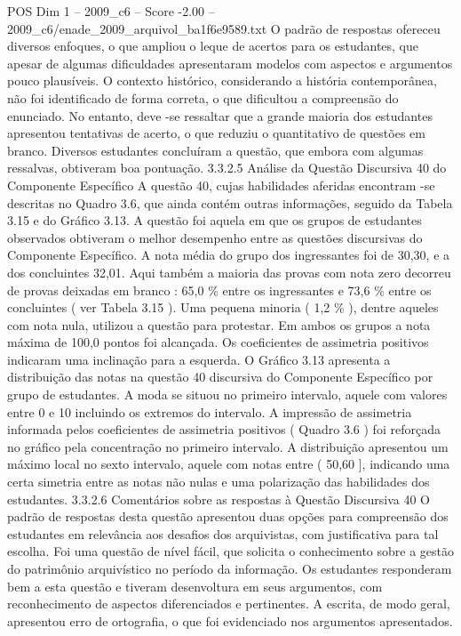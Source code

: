 \begin{textsample}{POS Dim 1 – 2009\_c6 – Score -2.00 – 2009\_c6/enade\_2009\_arquivol\_ba1f6e9589.txt}
O padrão de respostas ofereceu diversos enfoques, o que ampliou o leque de acertos para os estudantes, que apesar de algumas dificuldades apresentaram modelos com aspectos e argumentos pouco plausíveis.
O contexto histórico, considerando a história contemporânea, não foi identificado de forma correta, o que dificultou a compreensão do enunciado.
No entanto, deve -se ressaltar que a grande maioria dos estudantes apresentou tentativas de acerto, o que reduziu o quantitativo de questões em branco.
Diversos estudantes concluíram a questão, que embora com algumas ressalvas, obtiveram boa pontuação. 3.3.2.5 Análise da Questão Discursiva 40 do Componente Específico A questão 40, cujas habilidades aferidas encontram -se descritas no Quadro 3.6, que ainda contém outras informações, seguido da Tabela 3.15 e do Gráfico 3.13.
A questão foi aquela em que os grupos de estudantes observados obtiveram o melhor desempenho entre as questões discursivas do Componente Específico.
A nota média do grupo dos ingressantes foi de 30,30, e a dos concluintes 32,01.
Aqui também a maioria das provas com nota zero decorreu de provas deixadas em branco : 65,0 \% entre os ingressantes e 73,6 \% entre os concluintes ( ver Tabela 3.15 ).
Uma pequena minoria ( 1,2 \% ), dentre aqueles com nota nula, utilizou a questão para protestar.
Em ambos os grupos a nota máxima de 100,0 pontos foi alcançada.
Os coeficientes de assimetria positivos indicaram uma inclinação para a esquerda.
O Gráfico 3.13 apresenta a distribuição das notas na questão 40 discursiva do Componente Específico por grupo de estudantes.
A moda se situou no primeiro intervalo, aquele com valores entre 0 e 10 incluindo os extremos do intervalo.
A impressão de assimetria informada pelos coeficientes de assimetria positivos ( Quadro 3.6 ) foi reforçada no gráfico pela concentração no primeiro intervalo.
A distribuição apresentou um máximo local no sexto intervalo, aquele com notas entre ( 50,60 ], indicando uma certa simetria entre as notas não nulas e uma polarização das habilidades dos estudantes. 3.3.2.6 Comentários sobre as respostas à Questão Discursiva 40 O padrão de respostas desta questão apresentou duas opções para compreensão dos estudantes em relevância aos desafios dos arquivistas, com justificativa para tal escolha.
Foi uma questão de nível fácil, que solicita o conhecimento sobre a gestão do patrimônio arquivístico no período da informação.
Os estudantes responderam bem a esta questão e tiveram desenvoltura em seus argumentos, com reconhecimento de aspectos diferenciados e pertinentes.
A escrita, de modo geral, apresentou erro de ortografia, o que foi evidenciado nos argumentos apresentados.

\end{textsample}

